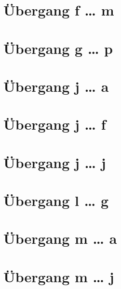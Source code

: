 \documentclass[a4paper,landscape]{article}
\begin{document}
\hspace*{-1ex}
\newpage

\section{Übergang f … m }

\hspace*{-1ex}
\newpage

\section{Übergang g … p }

\hspace*{-1ex}
\newpage

\section{Übergang j … a }

\hspace*{-1ex}
\newpage

\section{Übergang j … f }

\hspace*{-1ex}
\newpage

\section{Übergang j … j }

\hspace*{-1ex}
\newpage

\section{Übergang l … g }

\hspace*{-1ex}
\newpage

\section{Übergang m … a }

\hspace*{-1ex}
\newpage

\section{Übergang m … j }
\end{document}
